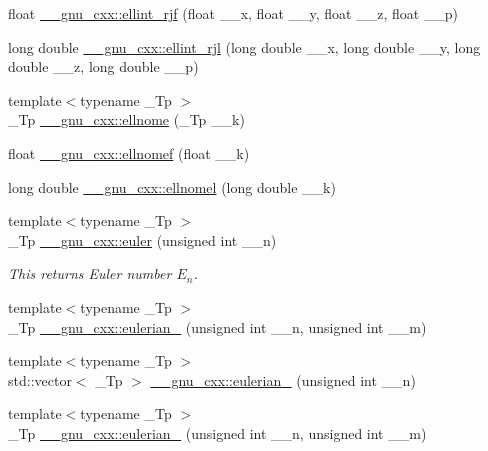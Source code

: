 \begin{DoxyCompactItemize}
\item 
float \hyperlink{group__mathsf__gnu_gace85b5190b04f57493878c5d672cfabd}{\+\_\+\+\_\+gnu\+\_\+cxx\+::ellint\+\_\+rjf} (float \+\_\+\+\_\+x, float \+\_\+\+\_\+y, float \+\_\+\+\_\+z, float \+\_\+\+\_\+p)
\item 
long double \hyperlink{group__mathsf__gnu_gab5405f1669b3ce8b560dc33aa5b97287}{\+\_\+\+\_\+gnu\+\_\+cxx\+::ellint\+\_\+rjl} (long double \+\_\+\+\_\+x, long double \+\_\+\+\_\+y, long double \+\_\+\+\_\+z, long double \+\_\+\+\_\+p)
\item 
{\footnotesize template$<$typename \+\_\+\+Tp $>$ }\\\+\_\+\+Tp \hyperlink{group__mathsf__gnu_ga7bfb34f8b5c0ed7c72040f9cb7034bba}{\+\_\+\+\_\+gnu\+\_\+cxx\+::ellnome} (\+\_\+\+Tp \+\_\+\+\_\+k)
\item 
float \hyperlink{group__mathsf__gnu_gad3ba08e5843ea0ec2bb9ddde3033adff}{\+\_\+\+\_\+gnu\+\_\+cxx\+::ellnomef} (float \+\_\+\+\_\+k)
\item 
long double \hyperlink{group__mathsf__gnu_ga0774570b24f654f8ae39e1865613a4e2}{\+\_\+\+\_\+gnu\+\_\+cxx\+::ellnomel} (long double \+\_\+\+\_\+k)
\item 
{\footnotesize template$<$typename \+\_\+\+Tp $>$ }\\\+\_\+\+Tp \hyperlink{group__mathsf__gnu_gac956e6457ab7d0d1765d281e73073f55}{\+\_\+\+\_\+gnu\+\_\+cxx\+::euler} (unsigned int \+\_\+\+\_\+n)
\begin{DoxyCompactList}\small\item\em This returns Euler number $ E_n $. \end{DoxyCompactList}\item 
{\footnotesize template$<$typename \+\_\+\+Tp $>$ }\\\+\_\+\+Tp \hyperlink{group__mathsf__gnu_gadfd8810a97655d2cdd1b0e3af68a79d3}{\+\_\+\+\_\+gnu\+\_\+cxx\+::eulerian\+\_} (unsigned int \+\_\+\+\_\+n, unsigned int \+\_\+\+\_\+m)
\item 
{\footnotesize template$<$typename \+\_\+\+Tp $>$ }\\std\+::vector$<$ \+\_\+\+Tp $>$ \hyperlink{group__mathsf__gnu_ga6597229d2557ccf12fd9c50a66919ceb}{\+\_\+\+\_\+gnu\+\_\+cxx\+::eulerian\+\_} (unsigned int \+\_\+\+\_\+n)
\item 
{\footnotesize template$<$typename \+\_\+\+Tp $>$ }\\\+\_\+\+Tp \hyperlink{group__mathsf__gnu_ga9bc456941d5e35cf54ec9c50f2e52884}{\+\_\+\+\_\+gnu\+\_\+cxx\+::eulerian\+\_} (unsigned int \+\_\+\+\_\+n, unsigned int \+\_\+\+\_\+m)

\end{DoxyCompactItemize}

